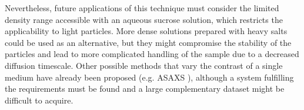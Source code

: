 Nevertheless, future applications of this technique must consider the limited density range accessible with an aqueous sucrose solution, which restricts the applicability to light particles. More dense solutions prepared with heavy salts could be used as an alternative, but they might compromise the stability of the particles and lead to more complicated handling of the sample due to a decreased diffusion timescale. Other possible methods that vary the contrast of a single medium have already been proposed (e.g. ASAXS \cite{stuhrmann_contrast_2007}), although a system fulfilling the requirements must be found and a large complementary dataset might be difficult to acquire.


